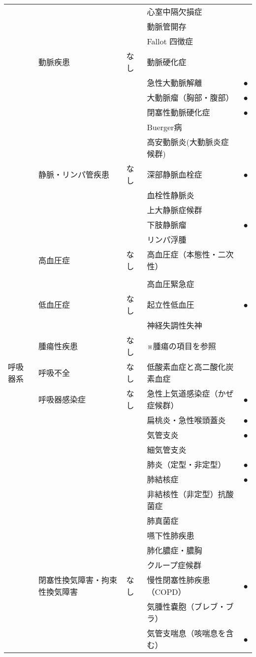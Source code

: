 \begin{xltabular}{\linewidth}{XXXXX}
 &  &  & 心室中隔欠損症 &  \\
 &  &  & 動脈管開存 &  \\
 &  &  & Fallot 四徴症 &  \\
 & 動脈疾患 & なし & 動脈硬化症 &  \\
 &  &  & 急性大動脈解離 & ● \\
 &  &  & 大動脈瘤（胸部・腹部） & ● \\
 &  &  & 閉塞性動脈硬化症 & ● \\
 &  &  & Buerger病 &  \\
 &  &  & 高安動脈炎(大動脈炎症候群) &  \\
 & 静脈・リンパ管疾患 & なし & 深部静脈血栓症 & ● \\
 &  &  & 血栓性静脈炎 &  \\
 &  &  & 上大静脈症候群 &  \\
 &  &  & 下肢静脈瘤 & ● \\
 &  &  & リンパ浮腫 &  \\
 & 高血圧症 & なし & 高血圧症（本態性・二次性） &  \\
 &  &  &  &  \\
 &  &  & 高血圧緊急症 &  \\
 & 低血圧症 & なし & 起立性低血圧 & ● \\
 &  &  & 神経失調性失神 &  \\
 & 腫瘍性疾患 & なし & ※腫瘍の項目を参照 &  \\
呼吸器系 & 呼吸不全 & なし & 低酸素血症と高二酸化炭素血症 &  \\
 & 呼吸器感染症 & なし & 急性上気道感染症（かぜ症候群） & ● \\
 &  &  & 扁桃炎・急性喉頭蓋炎 & ● \\
 &  &  & 気管支炎 & ● \\
 &  &  & 細気管支炎 &  \\
 &  &  & 肺炎（定型・非定型） & ● \\
 &  &  & 肺結核症 & ● \\
 &  &  & 非結核性（非定型）抗酸菌症 &  \\
 &  &  & 肺真菌症 &  \\
 &  &  & 嚥下性肺疾患 &  \\
 &  &  & 肺化膿症・膿胸 &  \\
 &  &  & クループ症候群 &  \\
 & 閉塞性換気障害・拘束性換気障害 & なし & 慢性閉塞性肺疾患 （COPD） & ● \\
 &  &  & 気腫性嚢胞（ブレブ・ブラ） &  \\
 &  &  & 気管支喘息（咳喘息を含む） & ● \\

\end{xltabular}
